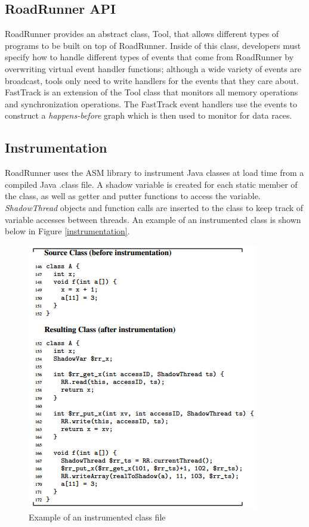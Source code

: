 \documentclass{acm_proc_article-sp}
\begin{document}
\subsection{RoadRunner API}
RoadRunner provides an abstract class, Tool, that allows different types of programs to be built on top of RoadRunner. Inside of this class, developers must specify how to handle different types of events that come from RoadRunner by overwriting virtual event handler functions; although a wide variety of events are broadcast, tools only need to write handlers for the events that they care about. FastTrack is an extension of the Tool class that monitors all memory operations and synchronization operations. The FastTrack event handlers use the events to construct a \emph{happens-before} graph which is then used to monitor for data races.


\subsection{Instrumentation}
RoadRunner uses the ASM \cite{Bruneton02} library to instrument Java classes at load time from a compiled Java .class file. A shadow variable is created for each static member of the class, as well as getter and putter functions to access the variable. \emph{ShadowThread} objects and function calls are inserted to the class to keep track of variable accesses between threads. An example of an instrumented class is shown below in Figure \ref{instrumentation}.
  \begin{figure}[h]
    \centering
      \includegraphics[scale=.5]{instrumentatin_new}
	\caption{Example of an instrumented class file} 
  \end{figure}
\end{document}
